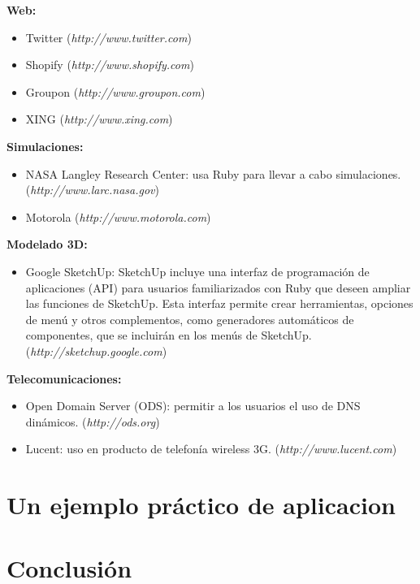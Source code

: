 \documentclass{article}
\begin{document}
\textbf{Web:}
\begin{itemize}
	\itemsep=1pt \topsep=0pt \partopsep=0pt \parskip=0pt \parsep=0pt
	\item Twitter (\textit{http://www.twitter.com})
	\item Shopify (\textit{http://www.shopify.com})
	\item Groupon (\textit{http://www.groupon.com})
	\item XING (\textit{http://www.xing.com})
\end{itemize}
\medskip

\textbf{Simulaciones:}
\begin{itemize}
	\itemsep=1pt \topsep=0pt \partopsep=0pt \parskip=0pt \parsep=0pt
	\item NASA Langley Research Center: usa Ruby para llevar a cabo simulaciones. (\textit{http://www.larc.nasa.gov})
	\item Motorola (\textit{http://www.motorola.com})
\end{itemize}
\medskip

\textbf{Modelado 3D:}
\begin{itemize}
	\itemsep=1pt \topsep=0pt \partopsep=0pt \parskip=0pt \parsep=0pt
	\item Google SketchUp: SketchUp incluye una interfaz de programación de aplicaciones (API) para usuarios familiarizados con Ruby que deseen ampliar las funciones de SketchUp. Esta interfaz permite crear herramientas, opciones de menú y otros complementos, como generadores automáticos de componentes, que se incluirán en los menús de SketchUp. (\textit{http://sketchup.google.com})
\end{itemize}
\medskip

\textbf{Telecomunicaciones:}
\begin{itemize}
	\itemsep=1pt \topsep=0pt \partopsep=0pt \parskip=0pt \parsep=0pt
	\item Open Domain Server (ODS): permitir a los usuarios el uso de DNS dinámicos. (\textit{http://ods.org})
	\item Lucent: uso en producto de telefonía wireless 3G. (\textit{http://www.lucent.com})
\end{itemize}
\medskip
\bigskip




\section{Un ejemplo práctico de aplicacion}

\bigskip




\section{Conclusión}
\end{document}

